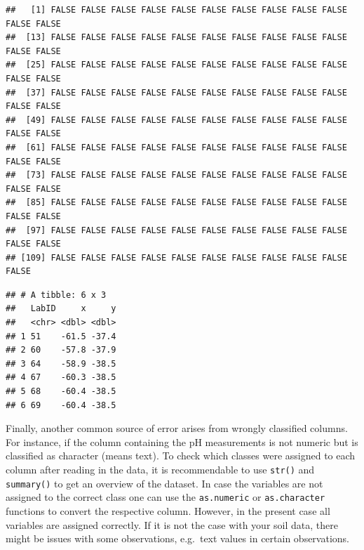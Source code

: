 \documentclass[
  10pt,
  b5paper,
  oneside]{book}
\newenvironment{Shaded}{\begin{snugshade}}{\end{snugshade}}
\newcommand{\CommentTok}[1]{\textcolor[rgb]{0.56,0.35,0.01}{\textit{#1}}}
\newcommand{\FunctionTok}[1]{\textcolor[rgb]{0.00,0.00,0.00}{#1}}
\newcommand{\NormalTok}[1]{#1}
\newcommand{\OtherTok}[1]{\textcolor[rgb]{0.56,0.35,0.01}{#1}}
\newcommand{\SpecialCharTok}[1]{\textcolor[rgb]{0.00,0.00,0.00}{#1}}
\begin{document}
\begin{Shaded}
\end{Shaded}

\begin{verbatim}
##   [1] FALSE FALSE FALSE FALSE FALSE FALSE FALSE FALSE FALSE FALSE FALSE FALSE
##  [13] FALSE FALSE FALSE FALSE FALSE FALSE FALSE FALSE FALSE FALSE FALSE FALSE
##  [25] FALSE FALSE FALSE FALSE FALSE FALSE FALSE FALSE FALSE FALSE FALSE FALSE
##  [37] FALSE FALSE FALSE FALSE FALSE FALSE FALSE FALSE FALSE FALSE FALSE FALSE
##  [49] FALSE FALSE FALSE FALSE FALSE FALSE FALSE FALSE FALSE FALSE FALSE FALSE
##  [61] FALSE FALSE FALSE FALSE FALSE FALSE FALSE FALSE FALSE FALSE FALSE FALSE
##  [73] FALSE FALSE FALSE FALSE FALSE FALSE FALSE FALSE FALSE FALSE FALSE FALSE
##  [85] FALSE FALSE FALSE FALSE FALSE FALSE FALSE FALSE FALSE FALSE FALSE FALSE
##  [97] FALSE FALSE FALSE FALSE FALSE FALSE FALSE FALSE FALSE FALSE FALSE FALSE
## [109] FALSE FALSE FALSE FALSE FALSE FALSE FALSE FALSE FALSE FALSE FALSE
\end{verbatim}

\begin{Shaded}
\end{Shaded}

\begin{verbatim}
## # A tibble: 6 x 3
##   LabID     x     y
##   <chr> <dbl> <dbl>
## 1 51    -61.5 -37.4
## 2 60    -57.8 -37.9
## 3 64    -58.9 -38.5
## 4 67    -60.3 -38.5
## 5 68    -60.4 -38.5
## 6 69    -60.4 -38.5
\end{verbatim}

Finally, another common source of error arises from wrongly classified columns. For instance, if the column containing the pH measurements is not numeric but is classified as character (means text). To check which classes were assigned to each column after reading in the data, it is recommendable to use \texttt{str()} and \texttt{summary()} to get an overview of the dataset.
In case the variables are not assigned to the correct class one can use the \texttt{as.numeric} or \texttt{as.character} functions to convert the respective column. However, in the present case all variables are assigned correctly. If it is not the case with your soil data, there might be issues with some observations, e.g.~text values in certain observations.
\end{document}
